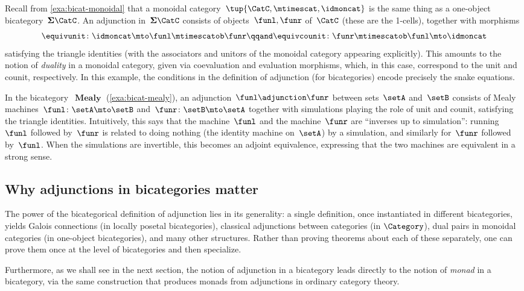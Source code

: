 \begin{example}
    \label{exa:bicat-adj-monoidal}
    Recall from \cref{exa:bicat-monoidal} that a monoidal category~$\tup{\CatC, \mtimescat, \idmoncat}$ is the same thing as a one-object bicategory~$\mathbf{\Sigma}\CatC$.
    An adjunction in~$\mathbf{\Sigma}\CatC$ consists of objects~$\funl, \funr$ of~$\CatC$ (these are the 1-cells), together with morphisms
    \begin{equation}
        \equivunit \colon \idmoncat \mto \funl \mtimescatob \funr \qqand \equivcounit \colon \funr \mtimescatob \funl \mto \idmoncat
    \end{equation}
    satisfying the triangle identities (with the associators and unitors of the monoidal category appearing explicitly).
    This amounts to the notion of \emph{duality} in a monoidal category, given via  coevaluation and  evaluation morphisms, which, in this case, correspond to the unit and counit, respectively. In this example, the conditions in the definition of adjunction (for bicategories) encode precisely the snake equations. 
\end{example}

\begin{example}
    \label{exa:bicat-adj-mealy}
    In the bicategory~$\operatorname{\textbf{Mealy}}$ (\cref{exa:bicat-mealy}), an adjunction~$\funl \adjunction \funr$ between sets~$\setA$ and~$\setB$ consists of Mealy machines~$\funl \colon \setA \mto \setB$ and~$\funr \colon \setB \mto \setA$ together with simulations playing the role of unit and counit, satisfying the triangle identities.
    Intuitively, this says that the machine~$\funl$ and the machine~$\funr$ are ``inverses up to simulation'': running~$\funl$ followed by~$\funr$ is related to doing nothing (the identity machine on~$\setA$) by a simulation, and similarly for~$\funr$ followed by~$\funl$.
    When the simulations are invertible, this becomes an adjoint equivalence, expressing that the two machines are equivalent in a strong sense.
\end{example}

\subsection{Why adjunctions in bicategories matter}

The power of the bicategorical definition of adjunction lies in its generality: a single definition, once instantiated in different bicategories, yields Galois connections (in locally posetal bicategories), classical adjunctions between categories (in $\Category$), dual pairs in monoidal categories (in one-object bicategories), and many other structures.
Rather than proving theorems about each of these separately, one can prove them once at the level of bicategories and then specialize.

Furthermore, as we shall see in the next section, the notion of adjunction in a bicategory leads directly to the notion of \emph{monad} in a bicategory, via the same construction that produces monads from adjunctions in ordinary category theory.
